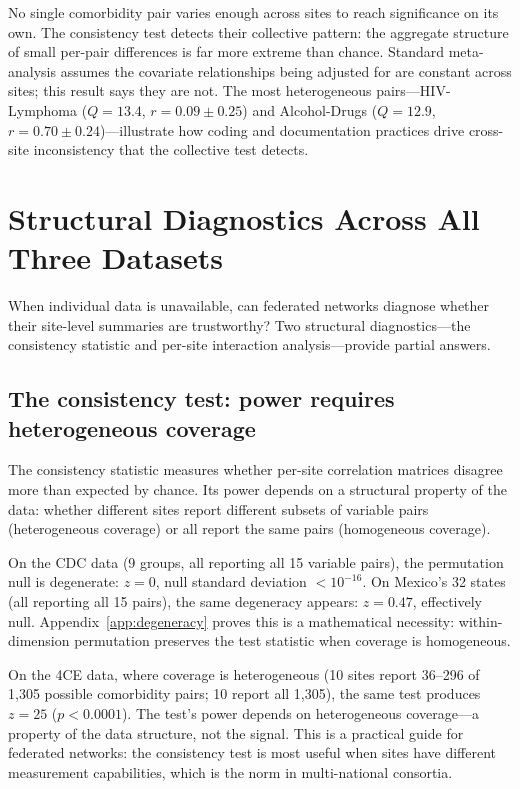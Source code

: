 \documentclass{article}
\begin{document}
No single comorbidity pair varies enough across sites to reach significance
on its own.  The consistency test detects their collective pattern: the
aggregate structure of small per-pair differences is far more extreme than
chance.  Standard meta-analysis assumes the covariate relationships being
adjusted for are constant across sites; this result says they are not.  The most
heterogeneous pairs---HIV-Lymphoma ($Q = 13.4$, $r = 0.09 \pm 0.25$) and
Alcohol-Drugs ($Q = 12.9$, $r = 0.70 \pm 0.24$)---illustrate how coding
and documentation practices drive cross-site inconsistency that the
collective test detects.


\section{Structural Diagnostics Across All Three Datasets}

When individual data is unavailable, can federated networks diagnose
whether their site-level summaries are trustworthy?  Two structural
diagnostics---the consistency statistic and per-site interaction
analysis---provide partial answers.

\subsection{The consistency test: power requires heterogeneous coverage}

The consistency statistic measures whether per-site correlation matrices
disagree more than expected by chance.  Its power depends on a structural
property of the data: whether different sites report different subsets of
variable pairs (heterogeneous coverage) or all report the same pairs
(homogeneous coverage).

On the CDC data (9 groups, all reporting all 15 variable pairs), the
permutation null is degenerate: $z = 0$, null standard deviation
$< 10^{-16}$.  On Mexico's 32 states (all reporting all 15 pairs), the
same degeneracy appears: $z = 0.47$, effectively null.
Appendix~\ref{app:degeneracy} proves this is a mathematical necessity:
within-dimension permutation preserves the test statistic when coverage is
homogeneous.

On the 4CE data, where coverage is heterogeneous (10 sites report
36--296 of 1,305 possible comorbidity pairs; 10 report all 1,305), the
same test produces $z = 25$ ($p < 0.0001$).  The test's power depends on
heterogeneous coverage---a property of the data structure, not the signal.
This is a practical guide for federated networks: the consistency test is
most useful when sites have different measurement capabilities,
which is the norm in multi-national consortia.
\end{document}
